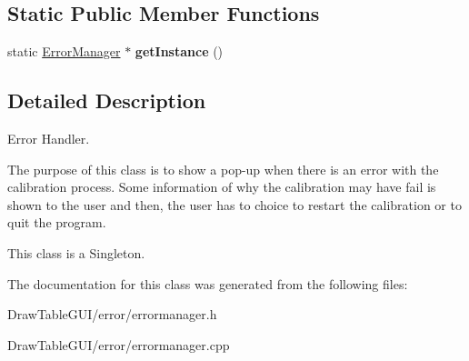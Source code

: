\subsection*{Static Public Member Functions}
\begin{DoxyCompactItemize}
\item 
\hypertarget{classErrorManager_a6632ebe84bc8eac8ca302c7a8c17e564}{}static \hyperlink{classErrorManager}{Error\+Manager} $\ast$ {\bfseries get\+Instance} ()\label{classErrorManager_a6632ebe84bc8eac8ca302c7a8c17e564}

\end{DoxyCompactItemize}


\subsection{Detailed Description}
Error Handler. 

The purpose of this class is to show a pop-\/up when there is an error with the calibration process. Some information of why the calibration may have fail is shown to the user and then, the user has to choice to restart the calibration or to quit the program.

This class is a Singleton. 

The documentation for this class was generated from the following files\+:\begin{DoxyCompactItemize}
\item 
Draw\+Table\+G\+U\+I/error/errormanager.\+h\item 
Draw\+Table\+G\+U\+I/error/errormanager.\+cpp\end{DoxyCompactItemize}
